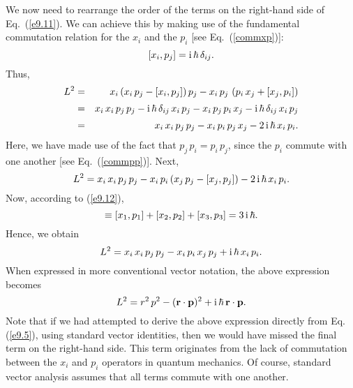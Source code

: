 We now need to rearrange the order of the terms on the right-hand
side of Eq.~(\ref{e9.11}). We can achieve this by making use of
the fundamental commutation relation for the $x_i$ and the $p_i$ [see Eq.~(\ref{commxp})]:
\begin{equation}\label{e9.12}
[x_i,p_j] = {\rm i}\,\hbar\,\delta_{ij}.
\end{equation}
Thus,
\begin{eqnarray}
L^2 &=& x_i\left(x_i\,p_j - [x_i,p_j]\right) p_j
- x_i\,p_j\,\left(p_i\,x_j+[x_j,p_i]\right)\nonumber\\[0.5ex]
&=&x_i\,x_i\,p_j\,p_j - {\rm i}\,\hbar\,\delta_{ij}\,x_i\,p_j
-x_i\,p_j\,p_i\,x_j - {\rm i}\,\hbar\,\delta_{ij}\,x_i\,p_j\nonumber\\[0.5ex]
&=&x_i\,x_i\,p_j\,p_j -x_i\,p_i\,p_j\,x_j - 2\,{\rm i}\,\hbar\,x_i\,p_i.
\end{eqnarray}
Here, we have made use of the fact that $p_j\,p_i=p_i\,p_j$, since
the $p_i$ commute with one another [see Eq.~(\ref{commpp})].
Next,
\begin{equation}
L^2 = x_i\,x_i\,p_j\,p_j - x_i\,p_i\left(x_j\,p_j - [x_j,p_j]\right) - 2\,{\rm i}\,\hbar\,x_i\,p_i.
\end{equation}
Now, according to (\ref{e9.12}),
\begin{equation}
[x_j,p_j]\equiv [x_1,p_1]+[x_2,p_2]+[x_3,p_3] = 3\,{\rm i}\,\hbar.
\end{equation}
Hence, we obtain
\begin{equation}
L^2 = x_i\,x_i\,p_j\,p_j - x_i\,p_i\,x_j\,p_j + {\rm i}\,\hbar\,x_i\,p_i.
\end{equation}
When expressed in more conventional vector notation, the above expression 
becomes
\begin{equation}\label{e9.17}
L^2 = r^2\,p^2 - ({\bf r}\cdot{\bf p})^2 + {\rm i}\,\hbar\,{\bf r}\cdot{\bf p}.
\end{equation}
Note that if we had attempted to derive the above expression
directly from Eq. (\ref{e9.5}), using standard vector identities, then we would have missed
the final term on the right-hand side. This term originates from the lack
of commutation between the $x_i$ and $p_i$ operators in quantum mechanics. Of course, standard
vector analysis assumes that all terms commute with one another.

